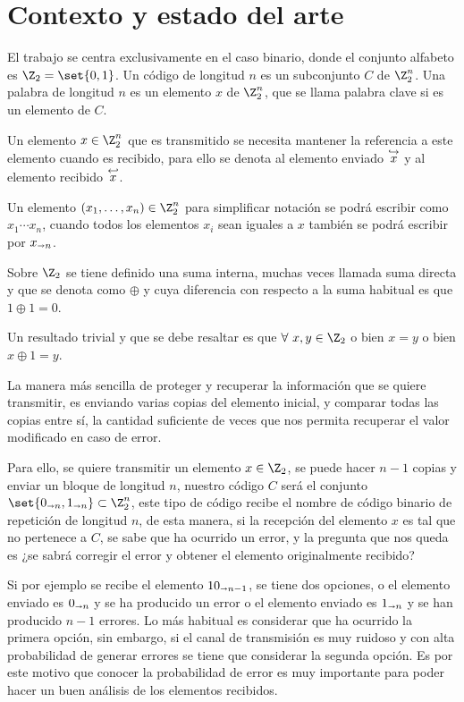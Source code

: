 \section{Contexto y estado del arte}

El trabajo se centra exclusivamente en el caso binario, donde el conjunto alfabeto es $\Z_2=\set{0, 1}$.
Un código de longitud $n$ es un subconjunto $C$ de $\Z_2^n$.
Una palabra de longitud $n$ es un elemento $x$ de $\Z_2^n$, que se llama palabra clave si es un elemento de $C$.

Un elemento $x\in\Z_2^n$ que es transmitido se necesita mantener la referencia a este elemento cuando es recibido, para ello se denota al elemento enviado $\stackrel{\hookrightarrow}{x}$ y al elemento recibido $\stackrel{\hookleftarrow}{x}$.

Un elemento $(x_1,\dots,x_n)\in\Z_2^n$ para simplificar notación se podrá escribir como $x_1\cdots x_n$, cuando todos los elementos $x_i$ sean iguales a $x$ también se podrá escribir por $x_{\shortrightarrow n}$.

Sobre $\Z_2$ se tiene definido una suma interna, muchas veces llamada suma directa y que se denota como $\oplus$ y cuya diferencia con respecto a la suma habitual es que $1\oplus 1 = 0$.

Un resultado trivial y que se debe resaltar es que $\forall\ x,y\in\Z_2$ o bien $x=y$ o bien $x\oplus 1=y$.

La manera más sencilla de proteger y recuperar la información que se quiere transmitir, es enviando varias copias del elemento inicial, y comparar todas las copias entre sí, la cantidad suficiente de veces que nos permita recuperar el valor modificado en caso de error.

Para ello, se quiere transmitir un elemento $x\in\Z_2$, se puede hacer $n-1$ copias y enviar un bloque de longitud $n$, nuestro código $C$ será el conjunto $\set{\logical{0}{n}, \logical{1}{n}}\subset \Z_2^n$, este tipo de código recibe el nombre de código binario de repetición de longitud $n$, de esta manera, si la recepción del elemento $x$ es tal que no pertenece a $C$, se sabe que ha ocurrido un error, y la pregunta que nos queda es ¿se sabrá corregir el error y obtener el elemento originalmente recibido?

Si por ejemplo se recibe el elemento $10_{\shortrightarrow n-1}$, se tiene dos opciones, o el elemento enviado es $0_{\shortrightarrow n}$ y se ha producido un error o el elemento enviado es $1_{\shortrightarrow n}$ y se han producido $n-1$ errores.
Lo más habitual es considerar que ha ocurrido la primera opción, sin embargo, si el canal de transmisión es muy ruidoso y con alta probabilidad de generar errores se tiene que considerar la segunda opción.
Es por este motivo que conocer la probabilidad de error es muy importante para poder hacer un buen análisis de los elementos recibidos.

